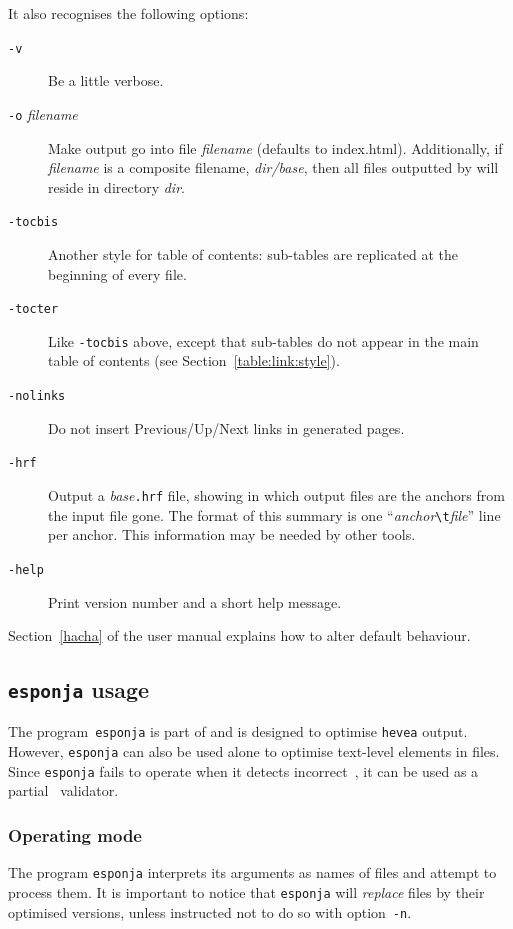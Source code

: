 It also recognises the following options:
\begin{description}
\item[{\tt -v}] Be a little verbose.
\item[{\tt -o} {\it filename}] Make \hacha{} output go into file
\textit{filename} (defaults  to index.html).
Additionally, if \textit{filename} is a composite filename,
\textit{dir/base}, then all files outputted by \hacha{} will
reside in directory \textit{dir}.
\item[{\tt -tocbis}]
Another style for table of contents:
sub-tables are replicated at the beginning of
every file.
\item[{\tt -tocter}]
Like \texttt{-tocbis} above, except that
sub-tables do not appear in the main table of contents
(see Section~\ref{table:link:style}).
\item[{\tt -nolinks}] Do not insert Previous/Up/Next links in
generated pages.
\item[{\tt -hrf}] Output a \textit{base}\texttt{.hrf} file, showing
in which output files are the anchors from the input file gone.
The format of this summary is one
``\textit{anchor}\verb+\t+\textit{file}'' line per anchor.
This information may be needed by other tools.
\item[{\tt -help}] Print version number and a short help message.
\end{description}

\noindent Section~\ref{hacha} of the user manual explains how to
alter \hacha{} default behaviour.

\subsection{\texttt{esponja} usage}\label{esponjausage}
The program~\texttt{esponja}
is part of \hevea{} and is designed to optimise \texttt{hevea}
output.
However, \texttt{esponja} can also be used alone to optimise
text-level elements in \html{} files.
Since \texttt{esponja} fails
to operate when it detects incorrect~\html, it can be used as a
partial \html~validator.


\subsubsection{Operating mode}
The program \texttt{esponja} interprets its arguments as names of
files and attempt to process them.
It is important to notice that \texttt{esponja} will \emph{replace} files
by their optimised versions, unless instructed not to do so with
option~\texttt{-n}.

